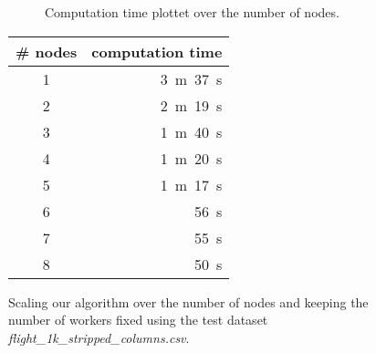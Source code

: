   \begin{figure}[htbp]
    \centering
    \begin{subfigure}[c]{0.6\textwidth}
      \centering
      \caption{Computation time plottet over the number of nodes.}
      \label{fig:fig:node-scaling}
    \end{subfigure}
    \begin{subtable}[c]{0.39\textwidth}
      \centering
      \begin{tabular}{cr}
        \toprule
        \textbf{\# nodes} & \textbf{computation time} \\
        \midrule
        1 & 3~m~37~s \\
        2 & 2~m~19~s \\
        3 & 1~m~40~s \\
        4 & 1~m~20~s \\
        5 & 1~m~17~s \\
        6 & 56~s \\
        7 & 55~s \\
        8 & 50~s \\
        \bottomrule
      \end{tabular}
      \caption{Computation time for finding all \glspl{od} in the dataset.}
      \label{fig:tab:node-scaling}
    \end{subtable}
    \caption{Scaling our algorithm over the number of nodes and keeping the number of workers fixed using the test dataset \textit{flight\_1k\_stripped\_columns.csv}.}
    \label{fig:node-scaling}
  \end{figure}